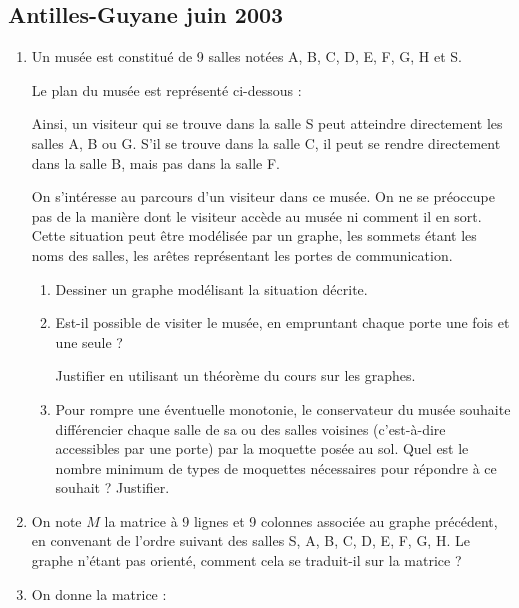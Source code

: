 \subsection{Antilles-Guyane juin 2003 }\label{ag03} 
\begin{enumerate}
\item Un musée est constitué de 9 salles notées A, B, C, D, E, F, G, H et S.

Le plan du musée est représenté ci-dessous :

\medskip
\begin{center}
\end{center}

\medskip
Ainsi, un visiteur qui se trouve dans la salle S peut atteindre directement les salles  A, B ou G. S'il se trouve dans la salle C, il peut se rendre directement dans la salle B, mais pas dans la salle F.

On s'intéresse au parcours d'un visiteur dans ce musée. On ne se préoccupe pas de la manière dont le visiteur accède au musée ni comment il en sort. Cette situation peut être modélisée par un graphe, les sommets étant les noms des salles, les arêtes représentant les portes de communication.

   \begin{enumerate} 
   \item Dessiner un graphe modélisant la situation décrite.
   \item Est-il possible de visiter le musée, en empruntant chaque porte une fois et une seule ?

Justifier en utilisant un théorème du cours sur les graphes.
\item Pour rompre une éventuelle monotonie, le conservateur du musée souhaite différencier chaque salle de sa ou des salles voisines (c'est-à-dire accessibles par une porte)  par la moquette posée au sol. Quel est le nombre minimum de types de moquettes nécessaires pour  répondre à ce souhait ? Justifier.
   \end{enumerate}
\item On note $M$ la matrice à 9 lignes et 9 colonnes associée au graphe précédent, en  convenant de l'ordre suivant des salles S, A, B, C, D, E, F, G, H. Le graphe n'étant pas orienté,  comment cela se traduit-il sur la matrice ?
\item  On donne la matrice :


\end{enumerate}
